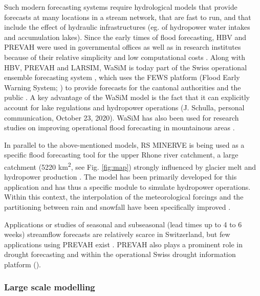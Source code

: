 \documentclass[10pt,a4paper]{article}
\begin{document}
Such modern forecasting systems require hydrological models that provide forecasts at many locations in a stream network, that are fast to run, and that include the effect of hydraulic infrastructures (eg. of hydropower water intakes and accumulation lakes). Since the early times of flood forecasting, HBV and PREVAH were used in governmental offices \citep{Jasper2016} as well as in research institutes because of their relative simplicity and low computational costs \citep{Verbunt2006, Addor_2011, Murphy_2019, Antonetti2019}. Along with HBV, PREVAH and LARSIM, WaSiM is today part of the Swiss operational ensemble forecasting system \citep{Jasper2016}, which uses the FEWS platform (Flood Early Warning System; \citealp{Werner_2013}) to provide forecasts for the cantonal authorities and the public \citep{FOEN2019}. A key advantage of the WaSiM model is the fact that it can explicitly account for lake regulations and hydropower operations (J. Schulla, personal communication, October 23, 2020). WaSiM has also been used for research studies on improving operational flood forecasting in mountainous areas \citep{Jasper2002, Jasper2003, Ahrens2003a, Ahrens2003b}.

In parallel to the above-mentioned models, RS MINERVE is being used as a specific flood forecasting tool for the upper Rhone river catchment, a large catchment (5220 km\textsuperscript{2}, see Fig. \ref{fig:map}) strongly influenced by glacier melt and hydropower production \citep{GarciaHernandez2009b, GarciaHernandez2009, Jordan2010}. The model has been primarily developed for this application and has thus a specific module to simulate hydropower operations. Within this context, the interpolation of the meteorological forcings and the partitioning between rain and snowfall have been specifically improved \citep{Tobin2011, Tobin2012}. 

Applications or studies of seasonal and subseasonal (lead times up to 4 to 6 weeks) streamflow forecasts are relatively scarce in Switzerland, but few applications using PREVAH exist \citep[][]{Monhart_2019, Anghileri2019}. PREVAH also plays a prominent role in drought forecasting \citep{Fundel2013, Jorg-Hess2015, Bogner2018b} and within the operational Swiss drought information platform (\citealp{Stahli2013}). 


\subsubsection{Large scale modelling}
\label{sec:application:largescale}
\end{document}
